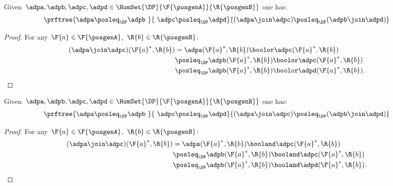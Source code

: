\begin{lemma}
    \label{lem:coprod_mon}
    Given~$\adpa,\adpb,\adpc,\adpd \in \HomSet{\DP}{\F{\posgenA}}{\R{\posgenB}}$ one has:
    \begin{equation*}
        \prftree{\adpa\posleq_\DP \adpb\ }{\ \adpc\posleq_\DP\adpd}{(\adpa\join\adpc)\posleq_\DP (\adpb\join \adpd)}
    \end{equation*}
\end{lemma}
\begin{proof}
    For any~$\F{a}\in \F{\posgenA}$,~$\R{b}\in \R{\posgenB}$:
    \begin{equation*}
        \begin{aligned}
        (\adpa \join \adpc)(\F{a}^*,\R{b})
            &=\adpa(\F{a}^*,\R{b})\boolor \adpc(\F{a}^*,\R{b})\\
            &\posleq_\DP \adpb(\F{a}^*,\R{b})\boolor \adpc(\F{a}^*,\R{b})\\
            &\posleq_\DP \adpb(\F{a}^*,\R{b})\boolor \adpd(\F{a}^*,\R{b}).
        \end{aligned}
    \end{equation*}
\end{proof}



\begin{lemma}
    \label{lem:intersection_mon}
    Given~$\adpa,\adpb,\adpc,\adpd \in \HomSet{\DP}{\F{\posgenA}}{\R{\posgenB}}$ one has:
    \begin{equation*}
        \prftree{\adpa\posleq_\DP \adpb\ }{\ \adpc\posleq_\DP \adpd}{(\adpa\join \adpc)\posleq_\DP (\adpb\join \adpd)}
    \end{equation*}
\end{lemma}
\begin{proof}
    For any~$\F{a}\in \F{\posgenA}$,~$\R{b}\in \R{\posgenB}$:
    \begin{equation*}
        \begin{aligned}
        (\adpa \join \adpc)(\F{a}^*,\R{b})
            &=\adpa(\F{a}^*,\R{b})\booland \adpc(\F{a}^*,\R{b})\\
            &\posleq_\DP \adpb(\F{a}^*,\R{b})\booland \adpc(\F{a}^*,\R{b})\\
            &\posleq_\DP \adpb(\F{a}^*,\R{b})\booland \adpd(\F{a}^*,\R{b}).
        \end{aligned}
    \end{equation*}
\end{proof}
